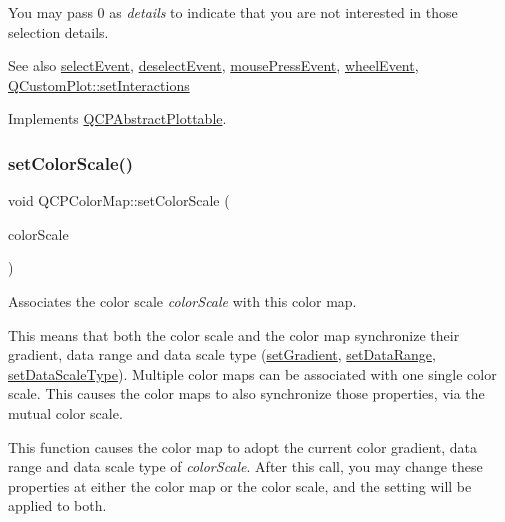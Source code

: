 You may pass 0 as {\itshape details} to indicate that you are not interested in those selection details.

\begin{DoxySeeAlso}{See also}
\mbox{\hyperlink{class_q_c_p_abstract_plottable_a2d488568cf16600dd81fa23d7d439829}{select\+Event}}, \mbox{\hyperlink{class_q_c_p_abstract_plottable_a9b104d9da4f38f934363945c313bf82e}{deselect\+Event}}, \mbox{\hyperlink{class_q_c_p_layerable_af6567604818db90f4fd52822f8bc8376}{mouse\+Press\+Event}}, \mbox{\hyperlink{class_q_c_p_layerable_a47dfd7b8fd99c08ca54e09c362b6f022}{wheel\+Event}}, \mbox{\hyperlink{class_q_custom_plot_a5ee1e2f6ae27419deca53e75907c27e5}{Q\+Custom\+Plot\+::set\+Interactions}} 
\end{DoxySeeAlso}


Implements \mbox{\hyperlink{class_q_c_p_abstract_plottable_addb3f5c41f007a78c3e142cc605bc712}{Q\+C\+P\+Abstract\+Plottable}}.

\mbox{\label{class_q_c_p_color_map_aa828921db364fe3c6af4619580ab85fd}} 
\subsubsection{\texorpdfstring{setColorScale()}{setColorScale()}}
{\footnotesize\ttfamily void Q\+C\+P\+Color\+Map\+::set\+Color\+Scale (\begin{DoxyParamCaption}\item[{\mbox{\hyperlink{class_q_c_p_color_scale}{Q\+C\+P\+Color\+Scale}} $\ast$}]{color\+Scale }\end{DoxyParamCaption})}

Associates the color scale {\itshape color\+Scale} with this color map.

This means that both the color scale and the color map synchronize their gradient, data range and data scale type (\mbox{\hyperlink{class_q_c_p_color_map_a7313c78360471cead3576341a2c50377}{set\+Gradient}}, \mbox{\hyperlink{class_q_c_p_color_map_a980b42837821159786a85b4b7dcb8774}{set\+Data\+Range}}, \mbox{\hyperlink{class_q_c_p_color_map_a9d20aa08e3c1f20f22908c45b9c06511}{set\+Data\+Scale\+Type}}). Multiple color maps can be associated with one single color scale. This causes the color maps to also synchronize those properties, via the mutual color scale.

This function causes the color map to adopt the current color gradient, data range and data scale type of {\itshape color\+Scale}. After this call, you may change these properties at either the color map or the color scale, and the setting will be applied to both.

